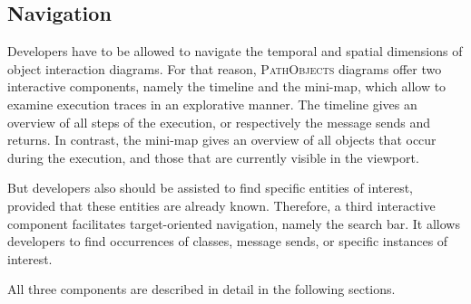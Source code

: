 \subsection{Navigation}
\label{ss:ApproachInteractiveNavigation}
Developers have to be allowed to navigate the temporal and spatial dimensions of object interaction diagrams.
For that reason, \textsc{PathObjects} diagrams offer two interactive components, namely the timeline and the mini-map, which allow to examine execution traces in an explorative manner.
The timeline gives an overview of all steps of the execution, or respectively the message sends and returns.
In contrast, the mini-map gives an overview of all objects that occur during the execution, and those that are currently visible in the viewport.

But developers also should be assisted to find specific entities of interest, provided that these entities are already known.
Therefore, a third interactive component facilitates target-oriented navigation, namely the search bar.
It allows developers to find occurrences of classes, message sends, or specific instances of interest.

All three components are described in detail in the following sections.

